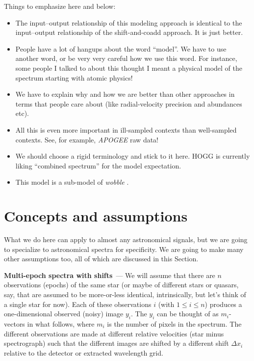 \documentclass[11pt]{article}
\renewcommand{\paragraph}[1]{\medskip\par\noindent\textbf{#1}~---}
\newcommand{\sectionname}{Section}
\begin{document}
Things to emphasize here and below:
\begin{itemize}
\item The input--output relationship of this modeling approach is identical to the input--output relationship of the shift-and-coadd approach. It is just better.
\item People have a lot of hangups about the word ``model''. We have to use another word, or be very very careful how we use this word. For instance, some people I talked to about this thought I meant a physical model of the spectrum starting with atomic physics!
\item We have to explain why and how we are better than other approaches in terms that people care about (like radial-velocity precision and abundances etc).
\item All this is even more important in ill-sampled contexts than well-sampled contexts. See, for example, \textsl{APOGEE} raw data!
\item We should choose a rigid terminology and stick to it here. HOGG is currently liking ``combined spectrum'' for the model expectation.
\item This model is a sub-model of \textsl{wobble} \cite{wobble}.
\end{itemize}

\section{Concepts and assumptions}\label{sec:assumptions}

What we do here can apply to almost any astronomical signals, but we are going to specialize to astronomical spectra for specificity.
We are going to make many other assumptions too, all of which are discussed in this \sectionname.

\paragraph{Multi-epoch spectra with shifts}
We will assume that there are $n$ observations (epochs) of the same star (or maybe of different stars or quasars, say, that are assumed to be more-or-less identical, intrinsically, but let's think of a single star for now).
Each of these observations $i$ (with $1\leq i\leq n$) produces a one-dimensional observed (noisy) image $y_i$.
The $y_i$ can be thought of as $m_i$-vectors in what follows, where $m_i$ is the number of pixels in the spectrum.
The different observations are made at different relative velocities (star minus spectrograph) such that the different images are shifted by a different shift $\Delta x_i$ relative to the detector or extracted wavelength grid.
\end{document}
